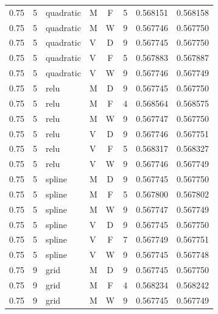 \begin{longtable}{rrllcrrr}
0.75 & 5 & quadratic & M & F & 5 & 0.568151 & 0.568158 \\

0.75 & 5 & quadratic & M & W & 9 & 0.567746 & 0.567750 \\

0.75 & 5 & quadratic & V & D & 9 & 0.567745 & 0.567750 \\

0.75 & 5 & quadratic & V & F & 5 & 0.567883 & 0.567887 \\

0.75 & 5 & quadratic & V & W & 9 & 0.567746 & 0.567749 \\

0.75 & 5 & relu & M & D & 9 & 0.567745 & 0.567750 \\

0.75 & 5 & relu & M & F & 4 & 0.568564 & 0.568575 \\

0.75 & 5 & relu & M & W & 9 & 0.567747 & 0.567750 \\

0.75 & 5 & relu & V & D & 9 & 0.567746 & 0.567751 \\

0.75 & 5 & relu & V & F & 5 & 0.568317 & 0.568327 \\

0.75 & 5 & relu & V & W & 9 & 0.567746 & 0.567749 \\

0.75 & 5 & spline & M & D & 9 & 0.567745 & 0.567750 \\

0.75 & 5 & spline & M & F & 5 & 0.567800 & 0.567802 \\

0.75 & 5 & spline & M & W & 9 & 0.567747 & 0.567749 \\

0.75 & 5 & spline & V & D & 9 & 0.567745 & 0.567750 \\

0.75 & 5 & spline & V & F & 7 & 0.567749 & 0.567751 \\

0.75 & 5 & spline & V & W & 9 & 0.567745 & 0.567748 \\

0.75 & 9 & grid & M & D & 9 & 0.567745 & 0.567750 \\

0.75 & 9 & grid & M & F & 4 & 0.568234 & 0.568242 \\

0.75 & 9 & grid & M & W & 9 & 0.567745 & 0.567749 \\


\end{longtable}

